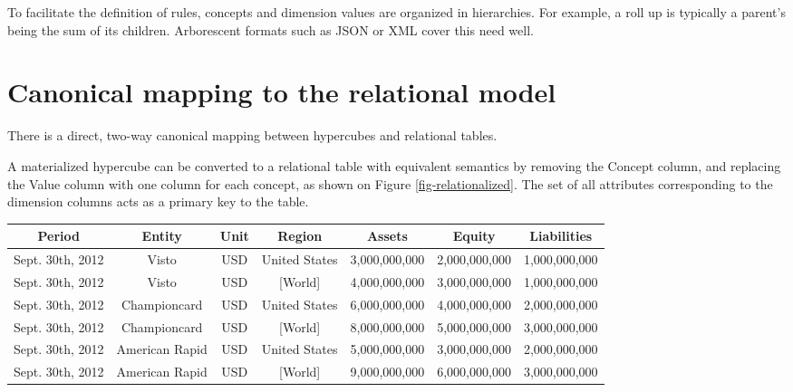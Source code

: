 \documentclass{acm_proc_article-sp}
\begin{document}
To facilitate the definition of rules, concepts and dimension values are organized in hierarchies. For example, a roll up is typically a parent's being the sum of its children. Arborescent formats such as JSON or XML cover this need well.

\section{Canonical mapping to the relational model}
\label{section-relational-mapping}
There is a direct, two-way canonical mapping between hypercubes and relational tables.

A materialized hypercube can be converted to a relational table with equivalent semantics by removing the Concept column, and replacing the Value column with one column for each concept, as shown on Figure \ref{fig-relationalized}. The set of all attributes corresponding to the dimension columns acts as a primary key to the table.

\begin{figure*}
\caption{A relational table corresponding to a hypercube. The \emph{concept} dimension is handled in a special way: all cells that have the same dimensions, but \emph{concept}, are grouped in a business object, and displayed in the same row.}
\centering
\label{fig-relationalized}
\vspace{3mm}
\begin{tabular}{|c|c|c|c||c|c|c|}
\hline
Period & Entity & Unit & Region & Assets & Equity & Liabilities \\
\hline
Sept. 30th, 2012 & Visto & USD & United States & 3,000,000,000 & 2,000,000,000 & 1,000,000,000 \\
Sept. 30th, 2012 & Visto & USD & [World] & 4,000,000,000 & 3,000,000,000 & 1,000,000,000 \\

Sept. 30th, 2012 & Championcard & USD & United States & 6,000,000,000 & 4,000,000,000 & 2,000,000,000 \\

Sept. 30th, 2012 & Championcard & USD & [World] & 8,000,000,000 & 5,000,000,000 & 3,000,000,000 \\

Sept. 30th, 2012 & American Rapid & USD & United States & 5,000,000,000 & 3,000,000,000 & 2,000,000,000 \\

Sept. 30th, 2012 & American Rapid & USD & [World] & 9,000,000,000 & 6,000,000,000 & 3,000,000,000 \\

\hline
\end{tabular}
\end{figure*}
\end{document}
